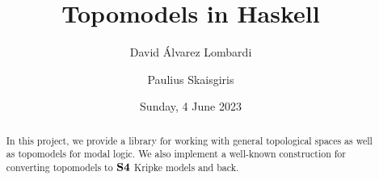 \documentclass[12pt,a4paper]{article}
\title{Topomodels in Haskell}
\author{David Álvarez Lombardi \and Paulius Skaisgiris}
\date{Sunday, 4 June 2023}
\begin{document}
\maketitle

\begin{abstract}
In this project, we provide a library for working with general topological spaces as well as topomodels for modal logic.
We also implement a well-known construction for converting topomodels to $\mathbf{S4}$ Kripke models and back.
\end{abstract}

\tableofcontents

\clearpage


























\end{document}
